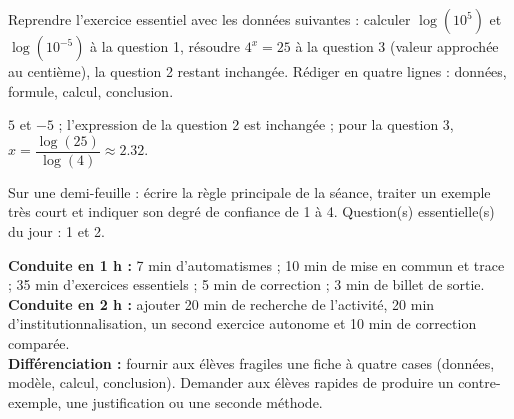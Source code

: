 
\begin{homework}Reprendre l'exercice essentiel avec les données suivantes : calculer $\log(10^{5})$ et $\log(10^{-5})$ à la question 1, résoudre $4^x=25$ à la question 3 (valeur approchée au centième), la question 2 restant inchangée. Rédiger en quatre lignes : données, formule, calcul, conclusion.\end{homework}
\begin{solution}$5$ et $-5$ ; l'expression de la question 2 est inchangée ; pour la question 3, $x=\dfrac{\log(25)}{\log(4)}\approx\num{2,32}$.\end{solution}

\begin{exitticket}[3 minutes]Sur une demi-feuille : écrire la règle principale de la séance, traiter un exemple très court et indiquer son degré de confiance de 1 à 4. Question(s) essentielle(s) du jour : 1 et 2.\end{exitticket}

\ifmxteacher
\begin{method}
\textbf{Conduite en 1 h :} 7 min d'automatismes ; 10 min de mise en commun et trace ; 35 min d'exercices essentiels ; 5 min de correction ; 3 min de billet de sortie.\\
\textbf{Conduite en 2 h :} ajouter 20 min de recherche de l'activité, 20 min d'institutionnalisation, un second exercice autonome et 10 min de correction comparée.\\
\textbf{Différenciation :} fournir aux élèves fragiles une fiche à quatre cases (données, modèle, calcul, conclusion). Demander aux élèves rapides de produire un contre-exemple, une justification ou une seconde méthode.
\end{method}
\fi

